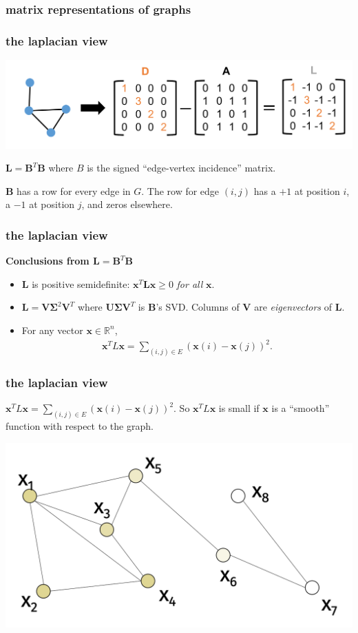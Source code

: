 \documentclass[compress]{beamer}
\newcommand{\bs}[1]{\boldsymbol{#1}}
\newcommand{\bv}[1]{\mathbf{#1}}
\newcommand{\R}{\mathbb{R}}
\begin{document}
\begin{frame}[t]
	\frametitle{matrix representations of graphs}
		\frametitle{the laplacian view}
		\begin{center}
			\includegraphics[width=.95\textwidth]{laplace.png}
			
			$\bv{L} = \bv{B}^T\bv{B}$ where $B$ is the signed ``edge-vertex incidence'' matrix.
		\end{center}
		$\bv{B}$ has a row for every edge in $G$. The row for edge $(i,j)$ has a $+1$ at position $i$, a $-1$ at position $j$, and zeros elsewhere. 	
\end{frame}


\begin{frame}[t]
	\frametitle{the laplacian view}
	\textbf{Conclusions from $\bv{L} = \bv{B}^T\bv{B}$}
	\begin{itemize}
		\item $\bv{L}$ is positive semidefinite: $\bv{x}^T\bv{L}\bv{x} \geq 0$ \emph{for all} $\bv{x}$. 
		\vspace{1em}
		\item $\bv{L} = \bv{V}\bs{\Sigma}^2\bv{V}^T$ where $\bv{U}\bs{\Sigma}\bv{V}^T$ is $\bv{B}$'s SVD. Columns of $\bv{V}$ are \emph{eigenvectors} of $\bv{L}$.
		\vspace{1em}
		\item 	\alert{For any vector $\bv{x}\in \R^n$, 
		\begin{align*}
			\bv{x}^T L \bv{x} = \sum_{(i,j)  \in E} (\bv{x}(i)- \bv{x}(j))^2. 
		\end{align*}}
	\end{itemize}	
\end{frame}

\begin{frame}[t]
	\frametitle{the laplacian view}
	$\bv{x}^T L \bv{x} = \sum_{(i,j)  \in E} (\bv{x}(i)- \bv{x}(j))^2$. So $\bv{x}^T L \bv{x}$ is small if $\bv{x}$ is a ``smooth'' function with respect to the graph. 
	\begin{center}
		\includegraphics[width=.8\textwidth]{smooth_func.png}
	\end{center}
\end{frame}
\end{document}
